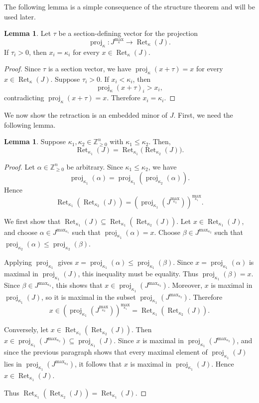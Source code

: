 \documentclass[11pt]{article}
\theoremstyle{definition}
\newtheorem{lemma}[theorem]{Lemma}
\theoremstyle{remark}
\newcommand{\Zgeqn}{\mathbb{Z}_{\geq 0}^n}     %
\DeclareMathOperator{\proj}{proj}              %
\newcommand{\kproj}{\proj_{\kappa}}            %
\DeclareMathOperator{\Ret}{Ret}                %
\newcommand{\RetK}{\Ret_{\kappa}}              %
\newcommand{\Jmax}{J^{\max_{\kappa}}}
\begin{document}
The following lemma is a simple consequence of the structure theorem and will be used later. 
\begin{lemma}\label{lemma:section_vectors_saturate_coordinates}
    Let $\tau$ be a section-defining vector for the projection
    \[
        \kproj\colon \Jmax\to\RetK(J).
    \]
    If $\tau_i>0$, then $x_i=\kappa_i$ for every $x\in\RetK(J)$.
\end{lemma}

\begin{proof}
    Since $\tau$ is a section vector, we have $\kproj(x+\tau)=x$ for every $x\in\RetK(J)$. Suppose $\tau_i>0$. If $x_i<\kappa_i$, then
    \[
        \kproj(x+\tau)_i>x_i,
    \]
    contradicting $\kproj(x+\tau)=x$. Therefore $x_i=\kappa_i$.
\end{proof}

We now show the retraction is an embedded minor of $J$. First, we need the following lemma.

\begin{lemma}\label{lemma:retraction_of_retraction}
    Suppose $\kappa_1,\kappa_2 \in \Zgeqn$ with $\kappa_1 \leq \kappa_2$. Then, \[\Ret_{\kappa_1}(J) = \Ret_{\kappa_1}\big(\Ret_{\kappa_2}(J)\big).\]
\end{lemma}

\begin{proof}
Let $\alpha\in\Zgeqn$ be arbitrary. Since $\kappa_1\leq \kappa_2$, we have
\[
\proj_{\kappa_1}(\alpha)=\proj_{\kappa_1}(\proj_{\kappa_2}(\alpha)).
\] 
Hence
\[
\Ret_{\kappa_1}(\Ret_{\kappa_2}(J))
=
\left(\proj_{\kappa_1}(J^{\max_{\kappa_2}})\right)^{\max_{\kappa_1}}.
\]

We first show that $\Ret_{\kappa_1}(J)\subseteq \Ret_{\kappa_1}(\Ret_{\kappa_2}(J))$. Let $x\in \Ret_{\kappa_1}(J)$, and choose $\alpha\in J^{\max_{\kappa_1}}$ such that $\proj_{\kappa_1}(\alpha)=x$. Choose $\beta \in J^{\max_{\kappa_2}}$ such that $\proj_{\kappa_2}(\alpha) \leq \proj_{\kappa_2}(\beta)$.

Applying $\proj_{\kappa_1}$ gives $x=\proj_{\kappa_1}(\alpha)\leq \proj_{\kappa_1}(\beta)$. Since $x=\proj_{\kappa_1}(\alpha)$ is maximal in $\proj_{\kappa_1}(J)$, this inequality must be equality. Thus $\proj_{\kappa_1}(\beta)=x$. Since $\beta\in J^{\max_{\kappa_2}}$, this shows that $x\in \proj_{\kappa_1}(J^{\max_{\kappa_2}})$. Moreover, $x$ is maximal in $\proj_{\kappa_1}(J)$, so it is maximal in the subset $\proj_{\kappa_1}(J^{\max_{\kappa_2}})$. Therefore 
\[
x\in \left(\proj_{\kappa_1}(J^{\max_{\kappa_2}})\right)^{\max_{\kappa_1}}=\Ret_{\kappa_1}(\Ret_{\kappa_2}(J)).
\]

Conversely, let $x\in \Ret_{\kappa_1}(\Ret_{\kappa_2}(J))$. Then $x\in \proj_{\kappa_1}(J^{\max_{\kappa_2}})\subseteq \proj_{\kappa_1}(J)$. Since $x$ is maximal in $\proj_{\kappa_1}(J^{\max_{\kappa_2}})$, and since the previous paragraph shows that every maximal element of $\proj_{\kappa_1}(J)$ lies in $\proj_{\kappa_1}(J^{\max_{\kappa_2}})$, it follows that $x$ is maximal in $\proj_{\kappa_1}(J)$. Hence $x\in \Ret_{\kappa_1}(J)$.

Thus $\Ret_{\kappa_1}(\Ret_{\kappa_2}(J))=\Ret_{\kappa_1}(J)$.
\end{proof}
\end{document}
